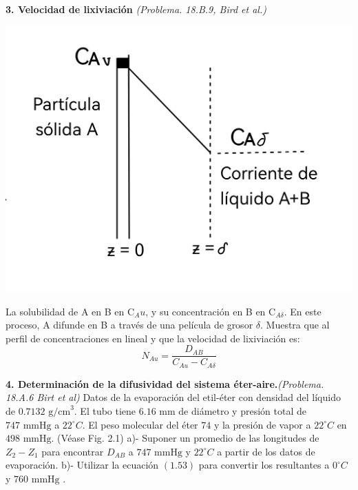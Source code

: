 \flushleft
\textbf{3. Velocidad de lixiviación} \textit{(Problema. 18.B.9, Bird et al.)}
\flushleft
\begin{minipage}{0.4\textwidth} %
    \includegraphics[width=\linewidth]{./Capitulo2/Imagenes/imagen-3.jpg} %
\end{minipage}
\hfill %
\begin{minipage}{0.5\textwidth} %
La solubilidad de A en B en C$_Au$, y su concentración en B en C$_{A\delta}$. En este proceso, A difunde en B a través de una película de grosor $\delta$. Muestra que al perfil de concentraciones en lineal y que la velocidad de lixiviación es: \[N_{Au}= \frac{D_{AB}}{C_{Au}-C_{A\delta}}\]
\end{minipage}
\vspace{0.1cm} %
\flushleft
\newpage
\textbf{4. Determinación de la difusividad del sistema éter-aire.}\textit{(Problema. 18.A.6 Birt et al)}
\vspace{0.2cm}
\flushleft
Datos de la evaporación del etil-éter con densidad del líquido de $0.7132 \text{ g/cm}^3$. El tubo tiene $6.16 \text{ mm}$ de diámetro y presión total de $747 \text{ mmHg}$  a $22^\circ C$. El peso molecular del éter $74$  y la presión de vapor a $22^\circ C$ en $498 \text{ mmHg}$. (Véase Fig. 2.1)
\vspace{0.2cm}
\flushleft
a)- Suponer un promedio de las longitudes de $Z_2 - Z_1$ para encontrar $D_{AB}$ a $747 \text{ mmHg}$ y $22^\circ C$ a partir de los datos de evaporación.
\flushleft
b)- Utilizar la ecuación $(1.53)$ para convertir los resultantes a $0^\circ C$ y $760\text{ mmHg}$ .


